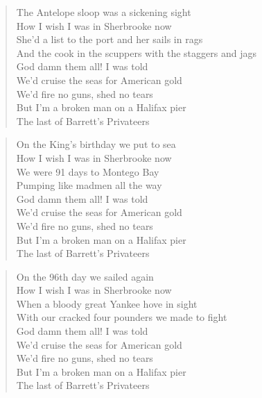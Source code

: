 \documentclass[8pt,twoside]{extarticle}
\newenvironment{xverse}{
	\interlinepenalty 10000
	\begin{verse}
	\begin{minipage}{\linewidth}
	\parskip 5pt
	\vspace{-6pt}
	}
	{
	\end{minipage}
	\end{verse}
	\penalty 0
	\vspace{-6pt}
	}
\begin{document}
\begin{xverse}
The Antelope sloop was a sickening sight \\
How I wish I was in Sherbrooke now \\
She'd a list to the port and her sails in rags \\
And the cook in the scuppers with the staggers and jags \\
God damn them all! I was told \\
We'd cruise the seas for American gold \\
We'd fire no guns, shed no tears \\
But I'm a broken man on a Halifax pier \\
The last of Barrett's Privateers \\
\end{xverse}

\begin{xverse}
On the King's birthday we put to sea \\
How I wish I was in Sherbrooke now \\
We were 91 days to Montego Bay \\
Pumping like madmen all the way \\
God damn them all! I was told \\
We'd cruise the seas for American gold \\
We'd fire no guns, shed no tears \\
But I'm a broken man on a Halifax pier \\
The last of Barrett's Privateers \\
\end{xverse}

\begin{xverse}
On the 96th day we sailed again \\
How I wish I was in Sherbrooke now \\
When a bloody great Yankee hove in sight \\
With our cracked four pounders we made to fight \\
God damn them all! I was told \\
We'd cruise the seas for American gold \\
We'd fire no guns, shed no tears \\
But I'm a broken man on a Halifax pier \\
The last of Barrett's Privateers \\
\end{xverse}
\end{document}

